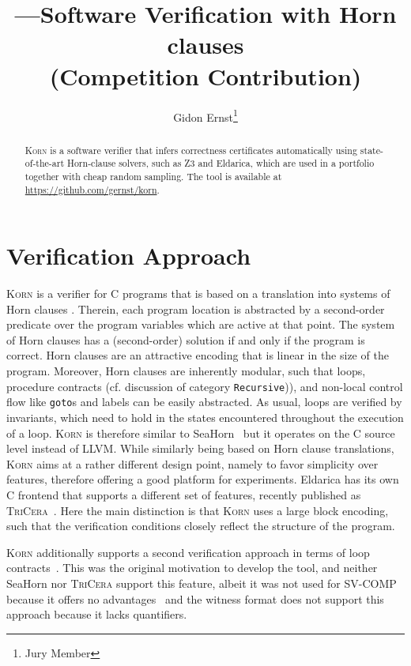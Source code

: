 \documentclass{llncs}
\author{Gidon Ernst\thanks{Jury Member}}
\title{\Korn---Software Verification with Horn clauses \\ (Competition Contribution)}
\institute{LMU Munich \\ \mailto{gidon.ernst@lmu.de}}
\newcommand{\Korn}{\textsc{Korn}\xspace}
\begin{document}
\maketitle

\begin{abstract}
    \Korn is a software verifier that infers correctness certificates automatically using state-of-the-art Horn-clause solvers, such as Z3 and Eldarica,
    which are used in a portfolio together with cheap random sampling.
    The tool is available at \url{https://github.com/gernst/korn}.

\end{abstract}

\section{Verification Approach}
\label{sec:approach}

\Korn is a verifier for C programs that is based on a translation into systems of Horn clauses
\cite{bjorner2015horn,gurfinkel2019science}.
Therein, each program location is abstracted by a second-order predicate
over the program variables which are active at that point.
The system of Horn clauses has a (second-order) solution if and only if the program is correct.
Horn clauses are an attractive encoding that is linear in the size of the program.
Moreover, Horn clauses are inherently modular,
such that loops, procedure contracts (cf. discussion of category \texttt{Recursive})), and non-local control flow like \texttt{goto}s and labels can be easily abstracted.
As usual, loops are verified by invariants, which need to hold in the states
encountered throughout the execution of a loop.
\Korn is therefore similar to SeaHorn~\cite{gurfinkel2015seahorn} but it operates on the C source level instead of LLVM.
While similarly being based on Horn clause translations,
\Korn aims at a rather different design point, namely to favor simplicity over features, therefore offering a good platform for experiments.
Eldarica has its own C frontend that supports a different set of features,
recently published as \textsc{TriCera}~\cite{esen2022tricera}.
Here the main distinction is that \Korn uses a large block encoding,
such that the verification conditions closely reflect the structure of the program.

\Korn additionally supports a second verification approach in terms of loop contracts~\cite{hehner1999refinement,tuerk2010local,hehner2005specified,ernst:vmcai2022}.
This was the original motivation to develop the tool, and neither
SeaHorn nor \textsc{TriCera} support this feature,
albeit it was not used for SV-COMP because
it offers no advantages~\cite{ernst:arxiv2020:summaries}
and the witness format does not support this approach because it lacks quantifiers.
\end{document}
